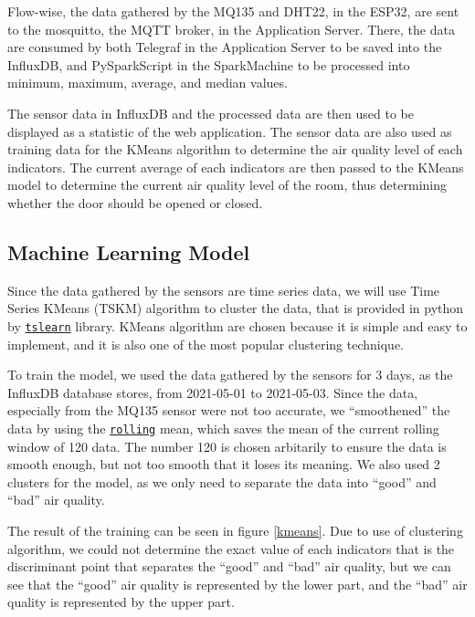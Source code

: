 Flow-wise, the data gathered by the MQ135 and DHT22, in the
ESP32, are sent to the mosquitto, the MQTT broker, in the
Application Server.
There, the data are consumed by both Telegraf in the
Application Server to be saved into the InfluxDB, and
PySparkScript in the SparkMachine to be processed into
minimum, maximum, average, and median values.

The sensor data in InfluxDB and the processed data are then
used to be displayed as a statistic of the web application.
The sensor data are also used as training data for the KMeans
algorithm to determine the air quality level of each
indicators. The current average of each indicators are then
passed to the KMeans model to determine the current air
quality level of the room, thus determining whether the door
should be opened or closed.

\subsection{Machine Learning Model}
Since the data gathered by the sensors are time
series data, we will use Time Series KMeans (TSKM)
algorithm to cluster the data, that is provided in
python by
\href{https://tslearn.readthedocs.io/en/stable/}{\texttt{tslearn}} library.
KMeans algorithm are chosen because it is simple and
easy to implement, and it is also one of the most
popular clustering technique.

To train the model, we used the data gathered by the
sensors for 3 days, as the InfluxDB database stores,
from 2021-05-01 to 2021-05-03. Since the data,
especially from the MQ135 sensor were not too
accurate, we ``smoothened'' the data by using the
\href{https://pandas.pydata.org/docs/reference/api/pandas.DataFrame.rolling.html}{\texttt{rolling}} mean, which saves
the mean of the current rolling window of 120 data. The number
120 is chosen arbitarily to ensure the data is smooth enough,
but not too smooth that it loses its meaning. We also used 2
clusters for the model, as we only need to separate the data
into ``good'' and ``bad'' air quality.

The result of the training can be seen in
figure \ref{kmeans}. Due to use of clustering algorithm, we could not
determine the exact value of each indicators that is the
discriminant point that separates the ``good'' and ``bad''
air quality, but we can see that the ``good'' air quality is
represented by the lower part, and the ``bad'' air quality is
represented by the upper part.

